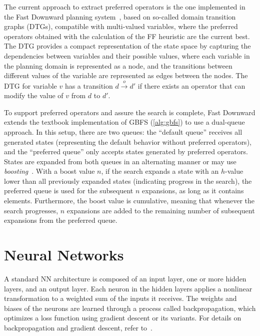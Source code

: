 \documentclass[ppgc,diss,english]{iiufrgs}
\begin{document}
The current approach to extract preferred operators is the one implemented in the Fast Downward planning system~\cite{Helmert/2009}, based on so-called domain transition graphs (DTGs), compatible with multi-valued variables, where the preferred operators obtained with the calculation of the FF heuristic are the current best. The DTG provides a compact representation of the state space by capturing the dependencies between variables and their possible values, where each variable in the planning domain is represented as a node, and the transitions between different values of the variable are represented as edges between the nodes. The DTG for variable $v$ has a transition $d \xrightarrow{o} d'$ if there exists an operator that can modify the value of $v$ from $d$ to $d'$.

To support preferred operators and assure the search is complete, Fast Downward extends the textbook implementation of GBFS (\cref{alg:gbfs}) to use a dual-queue approach. In this setup, there are two queues: the ``default queue'' receives all generated states (representing the default behavior without preferred operators), and the ``preferred queue'' only accepts states generated by preferred operators. States are expanded from both queues in an alternating manner or may use \emph{boosting}~\cite{Richter.Helmert/2009}. With a boost value $n$, if the search expands a state with an $h$-value lower than all previously expanded states (indicating progress in the search), the preferred queue is used for the subsequent $n$ expansions, as long as it contains elements. Furthermore, the boost value is cumulative, meaning that whenever the search progresses, $n$ expansions are added to the remaining number of subsequent expansions from the preferred queue.

\section{Neural Networks}
\label{sec:background-neural-nets}
A standard NN architecture is composed of an input layer, one or more hidden layers, and an output layer. Each neuron in the hidden layers applies a nonlinear transformation to a weighted sum of the inputs it receives. The weights and biases of the neurons are learned through a process called backpropagation, which optimizes a loss function using gradient descent or its variants. For details on backpropagation and gradient descent, refer to~\citet{Goodfellow.etal/2016}.
\end{document}
